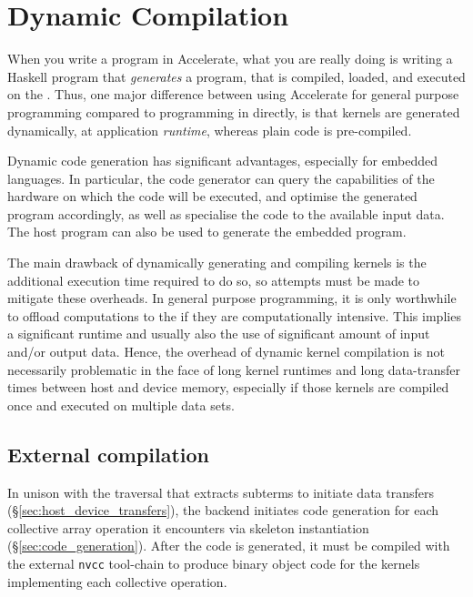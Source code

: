 \section{Dynamic Compilation}
\label{sec:dynamic_compilation}

When you write a program in Accelerate, what you are really doing is writing a
Haskell program that \emph{generates} a \CUDA program, that is compiled,
loaded, and executed on the \GPU@. Thus, one major difference between using
Accelerate for general purpose \GPU programming compared to programming in
\CUDA directly, is that kernels are generated dynamically, at application
\emph{runtime}, whereas plain \CUDA code is pre-compiled.

Dynamic code generation has significant advantages, especially for embedded
languages. In particular, the code generator can query the capabilities of the
hardware on which the code will be executed, and optimise the generated program
accordingly, as well as specialise the code to the available input data. The
host program can also be used to generate the embedded program.

The main drawback of dynamically generating and compiling \GPU kernels is the
additional execution time required to do so, so attempts must be made to
mitigate these overheads. In general purpose \GPU programming, it is only
worthwhile to offload computations to the \GPU if they are computationally
intensive. This implies a significant runtime and usually also the use of
significant amount of input and/or output data. Hence, the overhead of dynamic
kernel compilation is not necessarily problematic in the face of long kernel
runtimes and long data-transfer times between host and device memory, especially
if those kernels are compiled once and executed on multiple data sets.

\subsection{External compilation}
\label{sec:external_compilation}

In unison with the \AST traversal that extracts  subterms to initiate
data transfers (\S\ref{sec:host_device_transfers}), the \CUDA backend initiates
code generation for each collective array operation it encounters via skeleton
instantiation (\S\ref{sec:code_generation}). After the \CUDA code is generated,
it must be compiled with the external \texttt{nvcc} tool-chain to produce binary
object code for the kernels implementing each collective operation.

